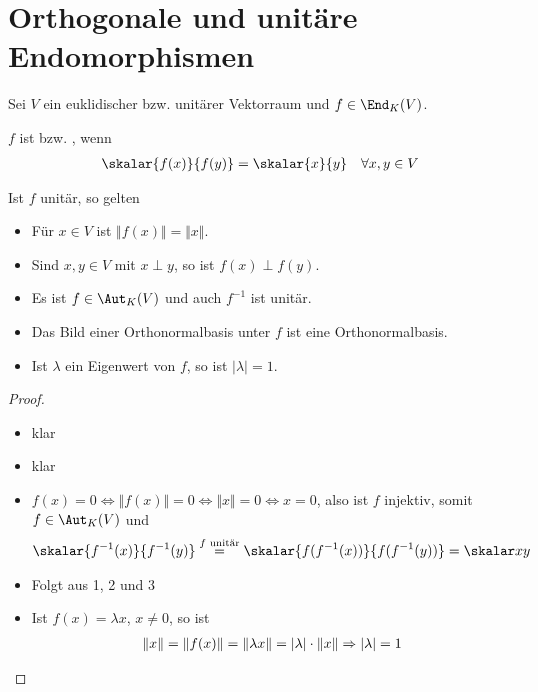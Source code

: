 \section{Orthogonale und unitäre Endomorphismen}

Sei $V$ ein euklidischer bzw. unitärer Vektorraum und $f\in\End_K(V)$.

\begin{definition}
	$f$ ist  bzw. , wenn 
	\begin{align}
		\skalar{f(x)}{f(y)}=\skalar{x}{y}\quad\forall x,y\in V\notag
	\end{align}
\end{definition}

\begin{proposition}
	Ist $f$ unitär, so gelten
	\begin{itemize}
		\item Für $x\in V$ ist $\Vert f(x)\Vert =\Vert x\Vert$.
		\item Sind $x,y\in V$ mit $x\perp y$, so ist $f(x)\perp f(y)$.
		\item Es ist $f\in\Aut_K(V)$ und auch $f^{-1}$ ist unitär.
		\item Das Bild einer Orthonormalbasis unter $f$ ist eine Orthonormalbasis.
		\item Ist $\lambda$ ein Eigenwert von $f$, so ist $\vert\lambda\vert=1$.
	\end{itemize}
\end{proposition}
\begin{proof}
	\begin{itemize}
		\item klar
		\item klar
		\item $f(x)=0\iff \Vert f(x)\Vert=0\iff \Vert x\Vert =0\iff x=0$, also ist $f$ injektiv, somit $f\in\Aut_K(V)$ und
		\begin{align}
			\skalar{f^{-1}(x)}{f^{-1}(y)}\overset{f\text{ unitär}}{=}\skalar{f(f^{-1}(x))}{f(f^{-1}(y))}=\skalar x y \notag
		\end{align}
		\item Folgt aus 1, 2 und 3
		\item Ist $f(x)=\lambda x$, $x\neq 0$, so ist
		\begin{align}
			\Vert x\Vert=\Vert f(x)\Vert =\Vert \lambda x\Vert =\vert\lambda\vert \cdot \Vert x\Vert \Rightarrow \vert\lambda\vert=1\notag 
		\end{align}
	\end{itemize}
\end{proof}

